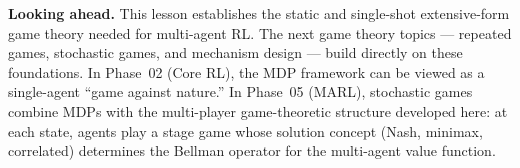 \documentclass[11pt,a4paper]{article}
\theoremstyle{definition}
\theoremstyle{plain}
\theoremstyle{remark}
\begin{document}
\bigskip

\noindent\textbf{Looking ahead.} This lesson establishes the static and single-shot
extensive-form game theory needed for multi-agent RL. The next game theory topics ---
repeated games, stochastic games, and mechanism design --- build directly on these
foundations. In Phase~02 (Core RL), the MDP framework can be viewed as a single-agent
``game against nature.'' In Phase~05 (MARL), stochastic games combine MDPs with the
multi-player game-theoretic structure developed here: at each state, agents play a
stage game whose solution concept (Nash, minimax, correlated) determines the Bellman
operator for the multi-agent value function.
\end{document}
